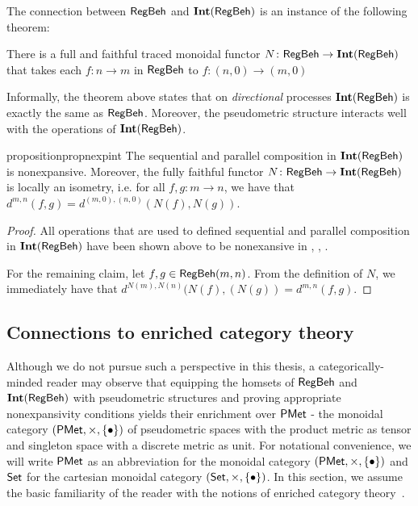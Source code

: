 	The connection between $\mathsf{RegBeh}$ and $\mathbf{Int}(\mathsf{RegBeh})$ is an instance of the following theorem:
	\begin{theorem}\label{thm:trace_embeds_int}
		There is a full and faithful traced monoidal functor $N \colon \mathsf{RegBeh} \to \mathbf{Int}(\mathsf{RegBeh})$ that takes each $f \colon n \to m$ in $\mathsf{RegBeh}$ to $f \colon (n,0) \to (m,0)$
	\end{theorem}
	Informally, the theorem above states that on \emph{directional} processes $\mathbf{Int}(\mathsf{RegBeh})$ is exactly the same as $\mathsf{RegBeh}$. Moreover, the pseudometric structure interacts well with the operations of $\mathbf{Int}(\mathsf{RegBeh})$.
	\begin{restatable}{proposition}{propnexpint}\label{cor:sem_enriched}
		The sequential and parallel composition in $\mathbf{Int}(\mathsf{RegBeh})$ is nonexpansive. Moreover, the fully faithful functor $N \colon \mathsf{RegBeh} \to \mathbf{Int}(\mathsf{RegBeh})$ is locally an isometry, i.e. for all $f,g \colon m \to n$, we have that $d^{m,n}(f,g)=d^{(m,0), (n,0)}(N(f),N(g))$.
	\end{restatable}
	\begin{proof}
		All operations that are used to defined sequential and parallel composition in $\mathbf{Int}(\mathsf{RegBeh})$ have been shown above to be nonexansive in , , .
		
		For the remaining claim, let $f,g \in \mathsf{RegBeh}(m,n)$. From the definition of $N$, we immediately have that $
		d^{N(m), N(n)}(N(f),(N(g))=d^{m,n}(f,g) $. 
	\end{proof}
	
	\subsection{Connections to enriched category theory}
Although we do not pursue such a perspective in this thesis, a categorically-minded reader may observe that equipping the homsets of $\mathsf{RegBeh}$ and $\mathbf{Int}(\mathsf{RegBeh})$ with pseudometric structures and proving appropriate nonexpansivity conditions yields their enrichment over $\mathsf{PMet}$ - the monoidal category $(\mathsf{PMet}, \times, \{\bullet\})$ of pseudometric spaces with the product metric as tensor and singleton space with a discrete metric as unit. For notational convenience, we will write $\mathsf{PMet}$ as an abbreviation for the monoidal category $(\mathsf{PMet}, \times, \{\bullet\})$ and ${\mathsf{Set}}$ for the cartesian monoidal category $({\mathsf{Set}},\times,\{\bullet\})$. In this section, we assume the basic familiarity of the reader with the notions of enriched category theory~\cite{Kelly:1982:Basic}.

